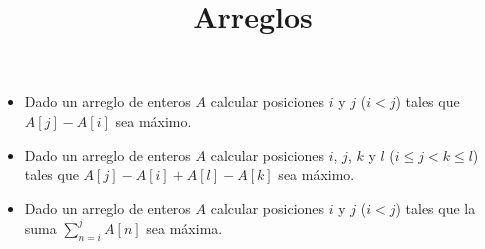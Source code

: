 \documentclass{article}
\begin{document}
\title{Arreglos}
\maketitle

\begin{itemize}
\item Dado un arreglo de enteros $A$ calcular posiciones $i$ y $j$ ($i < j$) tales que $A[j]-A[i]$ sea m\'aximo.
\item Dado un arreglo de enteros $A$ calcular posiciones $i$, $j$, $k$ y $l$ ($i\leq j<k\leq l$) tales que $A[j]-A[i]+A[l]-A[k]$ sea m\'aximo.
\item Dado un arreglo de enteros $A$ calcular posiciones $i$ y $j$ ($i < j$) tales que la suma $\sum\limits_{n=i}^j A[n]$ sea m\'axima.
\end{itemize}
\end{document}

